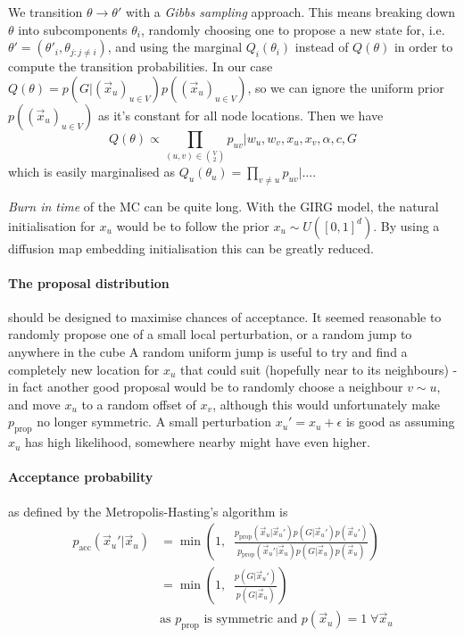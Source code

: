 We transition $\theta \to \theta'$ with a \textit{Gibbs sampling} approach. This means breaking down $\theta$ into subcomponents $\theta_i$, randomly choosing one to propose a new state for, i.e. $\theta' = (\theta'_i, \theta_{j:j \neq i})$, and using the marginal $Q_i(\theta_i)$ instead of $Q(\theta)$ in order to compute the transition probabilities.
In our case $Q(\theta) = p(G | (\vec{x}_u)_{u \in V}) p((\vec{x}_u)_{u \in V})$, so we can ignore the uniform prior $p((\vec{x}_u)_{u \in V})$ as it's constant for all node locations. Then we have 
\begin{equation}
  Q(\theta) \propto \prod_{(u,v) \in {V \choose 2}} p_{uv} | w_u, w_v, x_u, x_v, \alpha, c, G
\end{equation}
which is easily marginalised as $Q_u(\theta_u) = \prod_{v \neq u} p_{uv} | ...$.


\textit{Burn in time} of the MC can be quite long. With the GIRG model, the natural initialisation for $x_u$ would be to follow the prior $x_u \sim U([0, 1]^d)$. By using a diffusion map embedding initialisation this can be greatly reduced.

\paragraph{The proposal distribution} should be designed to maximise chances of acceptance. It seemed reasonable to randomly propose one of a small local perturbation, or a random jump to anywhere in the cube
A random uniform jump is useful to try and find a completely new location for $x_u$ that could suit (hopefully near to its neighbours) - in fact another good proposal would be to randomly choose a neighbour $v \sim u$, and move $x_u$ to a random offset of $x_v$, although this would unfortunately make $p_{\mathrm{prop}}$ no longer symmetric.
A small perturbation $x_u' = x_u + \epsilon$ is good as assuming $x_u$ has high likelihood, somewhere nearby might have even higher.

\paragraph{Acceptance probability} as defined by the Metropolis-Hasting's algorithm is
\begin{align}
  p_{\mathrm{acc}}(\vec{x}_u' | \vec{x}_u) &= \min \left (1,\;\;  \frac{p_{\mathrm{prop}}(\vec{x}_u | \vec{x}_u') p(G | \vec{x}_u') p(\vec{x}_u')}{p_{\mathrm{prop}}(\vec{x}_u' | \vec{x}_u) p(G | \vec{x}_u) p(\vec{x}_u)}\right )
  \\
  &= \min \left (1,\;\;  \frac{p(G | \vec{x}_u')}{p(G | \vec{x}_u)} \right )
  \\
  & \text{as $p_{\mathrm{prop}}$ is symmetric and $p(\vec{x}_u) = 1\; \forall \vec{x}_u$}
\end{align}

